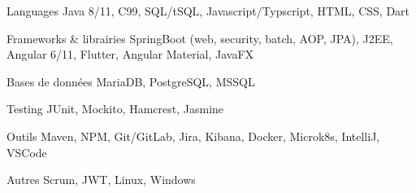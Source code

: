


\begin{cvskills}


\cvskill
{Languages} %
{Java 8/11, C99, SQL/tSQL, Javascript/Typscript, HTML, CSS, Dart} %


\cvskill
{Frameworks \& librairies} %
{SpringBoot (web, security, batch, AOP, JPA), J2EE, Angular 6/11, Flutter, Angular Material, JavaFX} %


\cvskill
{Bases de données} %
{MariaDB, PostgreSQL, MSSQL} %

\cvskill
{Testing} %
{JUnit, Mockito, Hamcrest, Jasmine} %

\cvskill
{Outils} %
{Maven, NPM, Git/GitLab, Jira, Kibana, Docker, Microk8s, IntelliJ, VSCode} %


\cvskill
{Autres} %
{Scrum, JWT, Linux, Windows} %

\end{cvskills}
